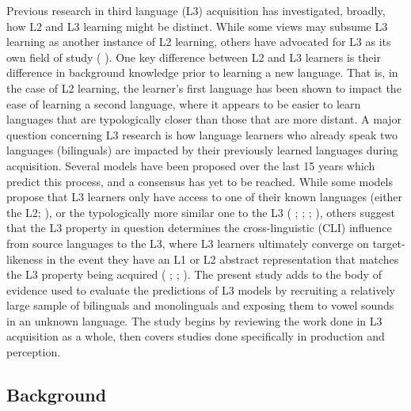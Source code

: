 \documentclass[preprints]{Definitions/mdpi}
\begin{document}
Previous research in third language (L3) acquisition has investigated, broadly, how L2 and L3 learning might be distinct.
While some views may subsume L3 learning as another instance of L2 learning, others have advocated for L3 as its own field of study (\citeauthor{flynn_cumulative-enhancement_2004} \citeyear{flynn_cumulative-enhancement_2004}).
One key difference between L2 and L3 learners is their difference in background knowledge prior to learning a new language.
That is, in the case of L2 learning, the learner's first language has been shown to impact the ease of learning a second language, where it appears to be easier to learn languages that are typologically closer than those that are more distant.
A major question concerning L3 research is how language learners who already speak two languages (bilinguals) are impacted by their previously learned languages during acquisition.
Several models have been proposed over the last 15 years which predict this process, and a consensus has yet to be reached.
While some models propose that L3 learners only have access to one of their known languages (either the L2;
\citeauthor{bardel_role_2007} \citeyear{bardel_role_2007}), or the typologically more similar one to the L3 (\citeauthor{rothman_typological_2010} \citeyear{rothman_typological_2010};
\citeauthor{rothman_l3_2011} \citeyear{rothman_l3_2011};
\citeauthor{baauw_cognitive_2013} \citeyear{baauw_cognitive_2013};
\citeauthor{rothman_linguistic_2015} \citeyear{rothman_linguistic_2015}), others suggest that the L3 property in question determines the cross-linguistic (CLI) influence from source languages to the L3, where L3 learners ultimately converge on target-likeness in the event they have an L1 or L2 abstract representation that matches the L3 property being acquired (\citeauthor{westergaard_crosslinguistic_2017} \citeyear{westergaard_crosslinguistic_2017};
\citeauthor{westergaard_microvariation_2021} \citeyear{westergaard_microvariation_2021}; \citeauthor{slabakova_scalpel_2017} \citeyear{slabakova_scalpel_2017}). The present study adds to the body of evidence used to evaluate the predictions of L3 models by recruiting a relatively large sample of bilinguals and monolinguals and exposing them to vowel sounds in an unknown language. The study begins by reviewing the work done in L3 acquisition as a whole, then covers studies done specifically in production and perception.

\hypertarget{background}{%
\subsection{Background}\label{background}}
\end{document}
